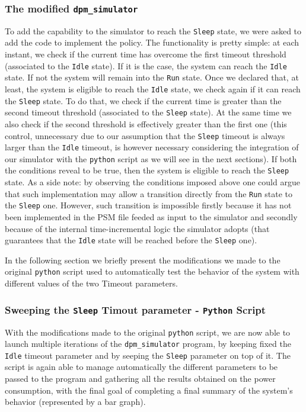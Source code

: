 \documentclass[a4paper]{article}
\begin{document}
        \subsubsection{The modified \texttt{dpm\_simulator}}
            To add the capability to the simulator to reach the \texttt{Sleep} state, we were asked to add the code to implement the policy. The functionality is pretty simple: at each instant, we check if the current time has overcome the first timeout threshold (associated to the \texttt{Idle} state). If it is the case, the system can reach the \texttt{Idle} state. If not the system will remain into the \texttt{Run} state. Once we declared that, at least, the system is eligible to reach the \texttt{Idle} state, we check again if it can reach the \texttt{Sleep} state. To do that, we check if the current time is greater than the second timeout threshold (associated to the \texttt{Sleep} state). At the same time we also check if the second threshold is effectively greater than the first one (this control, unnecessary due to our assumption that the \texttt{Sleep} timeout is always larger than the \texttt{Idle} timeout, is however necessary considering the integration of our simulator with the \texttt{python} script as we will see in the next sections). If both the conditions reveal to be true, then the system is eligible to reach the \texttt{Sleep} state.
            As a side note: by observing the conditions imposed above one could argue that such implementation may allow a transition directly from the \texttt{Run} state to the \texttt{Sleep} one. However, such transition is impossible firstly because it has not been implemented in the PSM file feeded as input to the simulator and secondly because of the internal time-incremental logic the simulator adopts (that guarantees that the \texttt{Idle} state will be reached before the \texttt{Sleep} one).

            In the following section we briefly present the modifications we made to the original \texttt{python} script used to automatically test the behavior of the system with different values of the two Timeout parameters.

        \subsubsection{Sweeping the \texttt{Sleep} Timout parameter - \texttt{Python} Script}
            With the modifications made to the original \texttt{python} script, we are now able to launch multiple iterations of the \texttt{dpm\_simulator} program, by keeping fixed the \texttt{Idle} timeout parameter and by seeping the \texttt{Sleep} parameter on top of it. The script is again able to manage automatically the different parameters to be passed to the program and gathering all the results obtained on the power consumption, with the final goal of completing a final summary of the system's behavior (represented by a bar graph).
\end{document}
